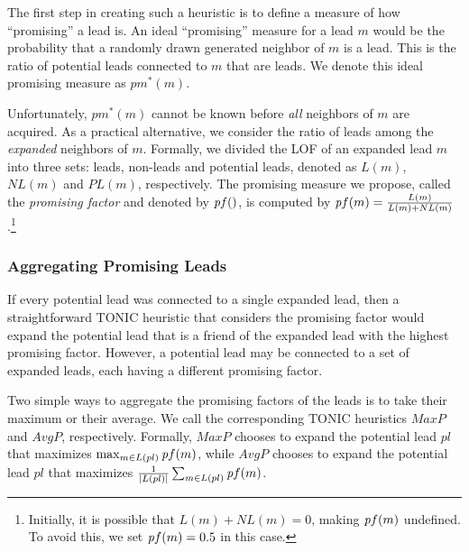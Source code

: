 \documentclass[journal]{IEEEtran}
\newcommand{\pf}{{\textit pf}}
\begin{document}
The first step in creating such a heuristic is to define a measure of how ``promising'' a lead is. An ideal ``promising'' measure for a lead $m$ would be the probability that a randomly drawn generated neighbor of $m$ is a lead. This is the ratio of potential leads connected to $m$ that are leads. We denote this ideal promising measure as $pm^*(m)$.

Unfortunately, $pm^*(m)$ cannot be known before {\em all} neighbors of $m$ are acquired. As a practical alternative, we consider the ratio of leads among the {\em expanded} neighbors of $m$. Formally, we divided the LOF of an expanded lead $m$ into three sets: leads, non-leads and potential leads, denoted as $L(m)$, $NL(m)$ and $PL(m)$, respectively. The promising measure we propose, called the {\em promising factor} and denoted by $\pf()$, is computed by $\pf(m)=\frac{L(m)}{L(m)+NL(m)}$.\footnote{Initially, it is possible that $L(m)+NL(m)=0$, making $\pf(m)$ undefined. To avoid this, we set $\pf(m)=0.5$ in this case.}


\subsubsection{Aggregating Promising Leads}

If every potential lead was connected to a single expanded lead, then a straightforward TONIC heuristic that considers the promising factor would expand the potential lead that is a friend of the expanded lead with the highest promising factor. However, a potential lead may be connected to a set of expanded leads, each having a different promising factor.

Two simple ways to aggregate the promising factors of the leads is to take their maximum or their average. We call the corresponding TONIC heuristics $MaxP$ and $AvgP$, respectively. Formally, $MaxP$ chooses to expand the potential lead $pl$ that maximizes $\max_{m\in L(pl)}{\pf(m)}$, while $AvgP$ chooses to expand the potential lead $pl$ that maximizes $\frac{1}{|L(pl)|}\sum_{m\in L(pl)} \pf(m)$. 
\end{document}

